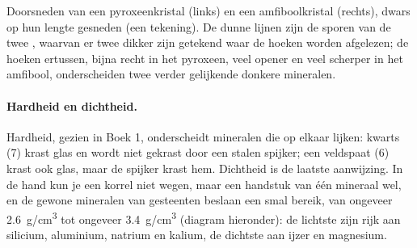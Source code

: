 \begin{omfigure}

{\small Doorsneden van een pyroxeenkristal (links) en een amfiboolkristal
(rechts), dwars op hun lengte gesneden (een tekening). De dunne lijnen zijn de sporen
van de twee , waarvan er twee dikker zijn getekend waar de hoeken worden afgelezen;
de hoeken ertussen, bijna recht in het pyroxeen, veel opener en veel scherper in het amfibool, onderscheiden twee
verder gelijkende donkere mineralen.}
\end{omfigure}

\paragraph{Hardheid en dichtheid.} Hardheid, gezien in Boek 1, onderscheidt
mineralen die op elkaar lijken: kwarts (7) krast glas en wordt niet gekrast door
een stalen spijker; een veldspaat (6) krast ook glas, maar de spijker krast hem.
Dichtheid is de laatste aanwijzing. In de hand kun je een korrel niet wegen, maar een
handstuk van één mineraal wel, en de gewone mineralen van gesteenten beslaan een smal
bereik, van ongeveer \qty{2.6}{g/cm^3} tot ongeveer \qty{3.4}{g/cm^3} (diagram hieronder):
de lichtste zijn rijk aan silicium, aluminium, natrium en kalium, de
dichtste aan ijzer en magnesium.

